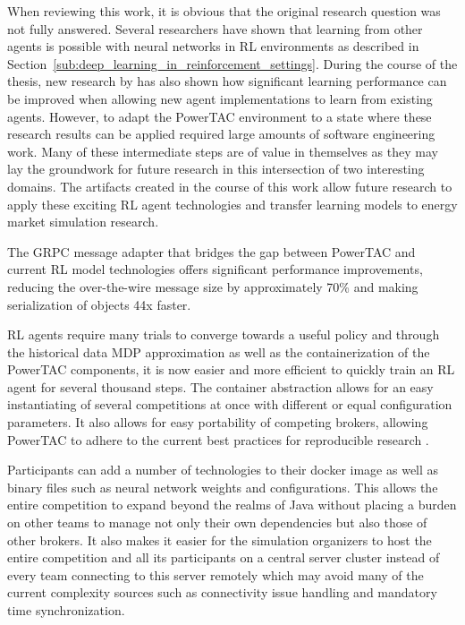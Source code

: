 When reviewing this work, it is obvious that the original research question was not fully answered. Several researchers
have shown that learning from other agents is possible with neural networks in \ac{RL} environments as described in
Section~\ref{sub:deep_learning_in_reinforcement_settings}. During the course of the thesis, new research by
\citet{schmitt2018kickstarting}  has also shown how significant learning performance can be improved when allowing new
agent implementations to learn from existing agents.
However, to adapt the \ac{PowerTAC} environment to a state where these research results can be applied required large
amounts of software engineering work. Many of these intermediate steps are of value in themselves as they may lay the
groundwork for future research in this intersection of two interesting domains. The artifacts created in the course of
this work allow future research to apply these exciting \ac{RL} agent technologies and transfer learning
models to energy market simulation research.

The \ac{GRPC} message adapter that bridges the gap between \ac{PowerTAC} and current \ac{RL} model technologies offers
significant performance improvements, reducing the over-the-wire message size by approximately 70\% and making serialization of objects 44x
faster.

\ac{RL} agents require many trials to converge towards a useful policy and through the historical data \ac{MDP}
approximation as well as the containerization of the \ac{PowerTAC} components, it is now easier and more efficient
to quickly train an \ac{RL} agent for several thousand steps. The container abstraction allows for an easy instantiating
of several competitions at once with different or equal configuration parameters. It also allows for easy portability of
competing brokers, allowing \ac{PowerTAC} to adhere to the current best practices for reproducible research \citep{boettiger2015introduction}.

Participants can add a number of technologies to their docker image as well as binary files such as neural network weights and
configurations. This allows the entire competition to expand beyond the realms of Java without placing a burden on other
teams to manage not only their own dependencies but also those of other brokers. It also makes it easier for the simulation
organizers to host the entire competition and all its participants on a central server cluster instead of every team connecting to
this server remotely which may avoid many of the current complexity sources such as connectivity issue handling and mandatory
time synchronization.

